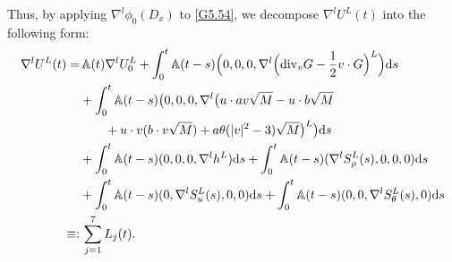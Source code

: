 \documentclass[reqno,11pt]{amsart}
\theoremstyle{plain}
\numberwithin{equation}{section}
\begin{document}
Thus, by applying $\nabla^l\phi_0(D_x)$ to \eqref{G5.54}, 
we decompose $\nabla^l U^L(t)$ into the following form:
\begin{align}\label{G5.55}  
 {\nabla^l} U^L(t) 
=&\,\mathbb{A}(t){\nabla^l}U^L_0+\int_0^t\mathbb{A}(t-s)\Big(0,0,0,{\nabla^l}
\Big({\rm div}_v G-\frac{1}{2}v\cdot G\Big)^L\Big)\mathrm{d}s\nonumber\\
&+\int_0^t\mathbb{A}(t-s) \big( 0,0,0,{\nabla^l}
\big(u\cdot av\sqrt{M}-u\cdot b\sqrt{M}\nonumber\\
& \ \ \ \ \ \ +u\cdot v(b\cdot v\sqrt{M})
+a\theta(|v|^2-3)\sqrt{M} \big)^L\big)\mathrm{d}s \nonumber\\
&+\int_0^t\mathbb{A}(t-s)(0,0,0,{\nabla^l}h^L)\mathrm{d}s
+\int_0^t\mathbb{A}(t-s)({\nabla^l}S^L_\rho(s),0,0,0)\mathrm{d}s\nonumber\\
&+\int_0^t\mathbb{A}(t-s)(0,{\nabla^
l}S^L_u(s),0,0)\mathrm{d}s+\int_0^t\mathbb{A}(t-s)(0,0,{\nabla^l}S^L_\theta(s),0)\mathrm{d}s\nonumber\\
\equiv:&\,\sum_{j=1}^7L_j(t). 
\end{align}  
\end{document}

